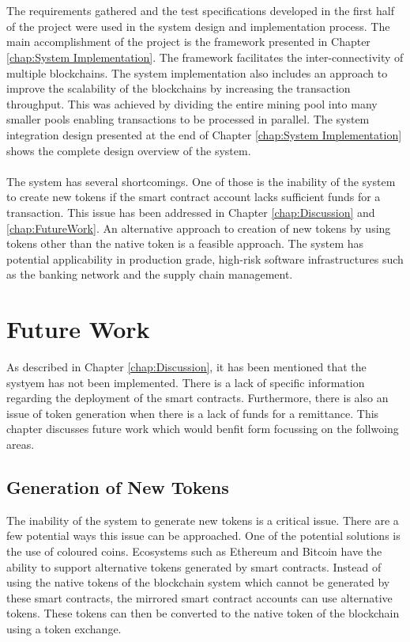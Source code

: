 \documentclass[a4paper,twoside,phd]{BYUPhys}
\begin{document}
\\
\\
The requirements gathered and the test specifications developed in the first half of the project were used in the system design and implementation process. The main accomplishment of the project is the framework presented in Chapter \ref{chap:System Implementation}. The framework facilitates the inter-connectivity of multiple blockchains. The system implementation also includes an approach to improve the scalability of the blockchains by increasing the transaction throughput. This was achieved by dividing the entire mining pool into many smaller pools enabling transactions to be processed in parallel. The system integration design presented at the end of Chapter \ref{chap:System Implementation} shows the complete design overview of the system. 
\\
\\
The system has several shortcomings. One of those is the inability of the system to create new tokens if the smart contract account lacks sufficient funds for a transaction. This issue has been addressed in Chapter \ref{chap:Discussion} and \ref{chap:FutureWork}. An alternative approach to creation of new tokens by using tokens other than the native token is a feasible approach. The system has potential applicability in production grade, high-risk software infrastructures such as the banking network and the supply chain management. 
\chapter{Future Work}
As described in Chapter \ref{chap:Discussion}, it has been mentioned that the systyem has not been implemented. There is a lack of specific information regarding the deployment of the smart contracts. Furthermore, there is also an issue of token generation when there is a lack of funds for a remittance. This chapter discusses future work which would benfit form focussing on the follwoing areas.

\section{Generation of New Tokens }
The inability of the system to generate new tokens is a critical issue. There are a few potential ways this issue can be approached. One of the potential solutions is the use of coloured coins. Ecosystems such as Ethereum and Bitcoin have the ability to support alternative tokens generated by smart contracts. Instead of using the native tokens of the blockchain system which cannot be generated by these smart contracts, the mirrored smart contract accounts can use alternative tokens. These tokens can then be converted to the native token of the blockchain using a token exchange. 
\end{document}
